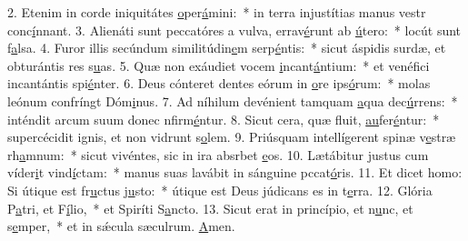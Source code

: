 2. Etenim in corde iniquitátes \uline{o}per\uline{á}mini:~* in terra injustítias manus vestr conc\uline{í}nnant.
3. Alienáti sunt peccatóres a vulva, errav\uline{é}runt ab \uline{ú}tero:~* locút sunt f\uline{a}lsa.
4. Furor illis secúndum similitúdin\uline{e}m serp\uline{é}ntis:~* sicut áspidis surdæ, et obturántis res s\uline{u}as.
5. Quæ non exáudiet vocem \uline{i}ncant\uline{á}ntium:~* et venéfici incantántis spi\uline{é}nter.
6. Deus cónteret dentes eórum in \uline{o}re ips\uline{ó}rum:~* molas leónum confríngt Dóm\uline{i}nus.
7. Ad níhilum devénient tamquam \uline{a}qua dec\uline{ú}rrens:~* inténdit arcum suum donec nfirm\uline{é}ntur.
8. Sicut cera, quæ fluit, \uline{au}fer\uline{é}ntur:~* supercécidit ignis, et non vidrunt s\uline{o}lem.
9. Priúsquam intellígerent spinæ v\uline{e}stræ rh\uline{a}mnum:~* sicut vivéntes, sic in ira absrbet \uline{e}os.
10. Lætábitur justus cum víder\uline{i}t vind\uline{í}ctam:~* manus suas lavábit in sánguine pccat\uline{ó}ris.
11. Et dicet homo: Si útique est fr\uline{u}ctus j\uline{u}sto:~* útique est Deus júdicans es in t\uline{e}rra.
12. Glória P\uline{a}tri, et F\uline{í}lio,~* et Spiríti S\uline{a}ncto.
13. Sicut erat in princípio, et n\uline{u}nc, et s\uline{e}mper,~* et in sǽcula sæculrum. \uline{A}men.
